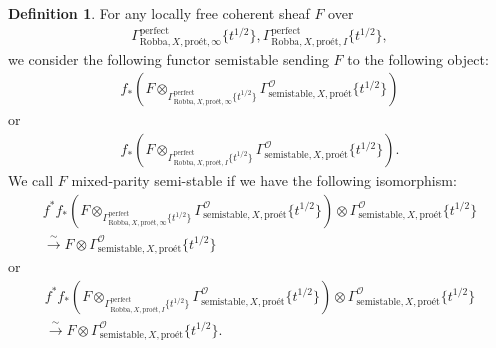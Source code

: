 \documentclass[12pt]{book}
\theoremstyle{definition}
\newtheorem{definition}{Definition}
\begin{document}
\begin{definition}
For any locally free coherent sheaf $F$ over
\begin{align}
\Gamma^\mathrm{perfect}_{\text{Robba},X,\text{pro\'et},\infty}\{t^{1/2}\},\Gamma^\mathrm{perfect}_{\text{Robba},X,\text{pro\'et},I}\{t^{1/2}\},
\end{align} 
we consider the following functor $\mathrm{semistable}$ sending $F$ to the following object:
\begin{align}
f_*(F\otimes_{\Gamma^\mathrm{perfect}_{\text{Robba},X,\text{pro\'et},\infty}\{t^{1/2}\}} \Gamma^\mathcal{O}_{\text{semistable},X,\text{pro\'et}}\{t^{1/2}\})
\end{align}
or 
\begin{align}
f_*(F\otimes_{\Gamma^\mathrm{perfect}_{\text{Robba},X,\text{pro\'et},I}\{t^{1/2}\}} \Gamma^\mathcal{O}_{\text{semistable},X,\text{pro\'et}}\{t^{1/2}\}).
\end{align}
We call $F$ mixed-parity semi-stable if we have the following isomorphism:
\begin{align}
f^*f_*(F\otimes_{\Gamma^\mathrm{perfect}_{\text{Robba},X,\text{pro\'et},\infty}\{t^{1/2}\}} \Gamma^\mathcal{O}_{\text{semistable},X,\text{pro\'et}}\{t^{1/2}\}) \otimes \Gamma^\mathcal{O}_{\text{semistable},X,\text{pro\'et}}\{t^{1/2}\}\\ \overset{\sim}{\longrightarrow} F \otimes \Gamma^\mathcal{O}_{\text{semistable},X,\text{pro\'et}}\{t^{1/2}\} 
\end{align}
or 
\begin{align}
f^*f_*(F\otimes_{\Gamma^\mathrm{perfect}_{\text{Robba},X,\text{pro\'et},I}\{t^{1/2}\}} \Gamma^\mathcal{O}_{\text{semistable},X,\text{pro\'et}}\{t^{1/2}\}) \otimes \Gamma^\mathcal{O}_{\text{semistable},X,\text{pro\'et}}\{t^{1/2}\}\\ \overset{\sim}{\longrightarrow} F \otimes \Gamma^\mathcal{O}_{\text{semistable},X,\text{pro\'et}}\{t^{1/2}\}. 
\end{align}
\end{definition}
\end{document}
